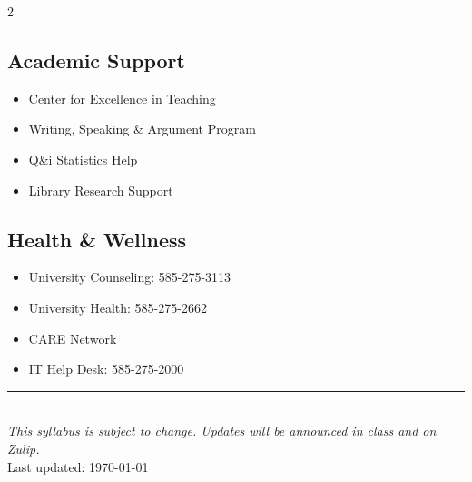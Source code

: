 \documentclass[11pt,letterpaper]{article}
\begin{document}
\begin{multicols}{2}
\subsection{Academic Support}
\begin{itemize}[leftmargin=*,itemsep=2pt]
    \item Center for Excellence in Teaching
    \item Writing, Speaking \& Argument Program
    \item Q\&i Statistics Help
    \item Library Research Support
\end{itemize}

\subsection{Health \& Wellness}
\begin{itemize}[leftmargin=*,itemsep=2pt]
    \item University Counseling: 585-275-3113
    \item University Health: 585-275-2662
    \item CARE Network
    \item IT Help Desk: 585-275-2000
\end{itemize}
\end{multicols}

\vfill

\begin{center}
\color{darkgray}
\rule{0.3\textwidth}{0.5pt}\\[0.5em]
\small\textit{This syllabus is subject to change. Updates will be announced in class and on Zulip.}\\
Last updated: \today
\end{center}
\end{document}
